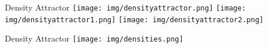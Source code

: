 \begin{frame}{Density Attractor}
	\centering
	\vspace{1cm}
	\texttt{[image: img/densityattractor.png]}
	\texttt{[image: img/densityattractor1.png]}
	\texttt{[image: img/densityattractor2.png]}
\end{frame}

\begin{frame}{Density Attractor}
	\centering
	\texttt{[image: img/densities.png]}
\end{frame}
